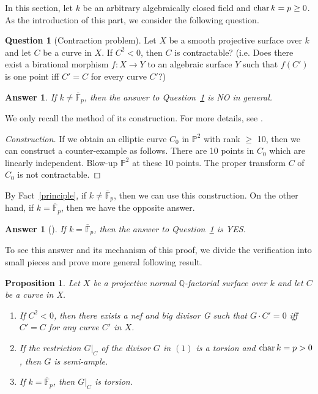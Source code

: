 \documentclass[12pt,twoside]{amsart}
\newtheorem{prop}[thm]{Proposition}
\newtheorem{ans}[thm]{Answer}
\theoremstyle{definition}
\newtheorem{ques}[thm]{Question}
\newcommand{\pr}[1]{$\mathbb{P}^#1$}
\newcommand{\Q}{$\mathbb{Q}$}
\newcommand{\fff}{\overline{\mathbb{F}}_p}
\begin{document}
In this section, let $k$ be an arbitrary algebraically closed field 
and ${\rm char}\,k=p\geq 0$. 
As the introduction of this part, 
we consider the following question. 

\begin{ques}[Contraction problem]\label{contprob}
Let $X$ be a smooth projective surface over $k$ and 
let $C$ be a curve in $X$. 
If $C^2<0$, then $C$ is contractable? 
(i.e. Does there exist a birational morphism $f:X \to Y$
to an algebraic surface $Y$  such that $f(C')$ is one point 
iff $C'=C$ for every curve $C'$?) 
\end{ques}


\begin{ans}\label{Hironaka}
If $k \neq \overline{\mathbb{F}}_p$, 
then the answer to Question~\ref{contprob} is 
NO in general. 
\end{ans}

We only recall the method of its construction. 
For more details, see \cite[Example~5.7.3]{Hartshorne}.

\begin{proof}[Construction]
If we obtain an elliptic curve $C_0$ in \pr2 with rank $\geq$ 10, 
then we can construct a counter-example as follows. 
There are 10 points in $C_0$ which are linearly independent. 
Blow-up \pr2 at these 10 points. 
The proper transform $C$ of $C_0$ is not contractable. 
\end{proof}

By Fact~\ref{principle}, if $k \neq \overline{\mathbb{F}}_p$, 
then we can use this construction. 
On the other hand, if $k=\fff$, 
then we have the opposite answer. 

\begin{ans}[\cite{Artin}]
If $k=\fff$, then the answer to Question~\ref{contprob} is YES.
\end{ans}

To see this answer and its mechanism of this proof, 
we divide the verification into small pieces and 
prove more general following result.


\begin{prop}\label{fffcont}
Let $X$ be a projective normal \Q-factorial surface over $k$ and 
let $C$ be a curve in X. 
\begin{enumerate}
\item{If $C^2<0$, then there exists a nef and big divisor G such that 
$G\cdot C'=0$ iff $C'=C$ for any curve $C'$ in $X$. }
\item{If the restriction $G|_{C}$ of the divisor $G$ in $(1)$
is a torsion and ${\rm char}\,k=p>0$, then $G$ is semi-ample.}
\item{If $k=\fff$, then $G|_{C}$ is torsion.}
\end{enumerate}
\end{prop}
\end{document}
